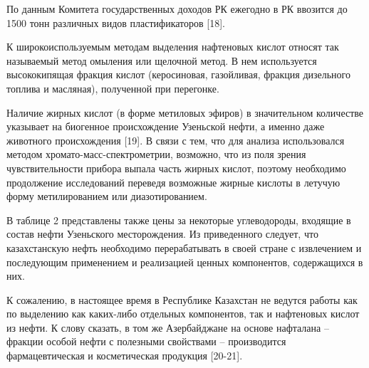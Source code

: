 \begin{multicols}{2}
По данным Комитета государственных доходов РК ежегодно в РК ввозится до
1500 тонн различных видов пластификаторов {[}18{]}.

К широкоиспользуемым методам выделения нафтеновых кислот относят так
называемый метод омыления или щелочной метод. В нем используется
высококипящая фракция кислот (керосиновая, газойливая, фракция
дизельного топлива и масляная), полученной при перегонке.

Наличие жирных кислот (в форме метиловых эфиров) в значительном
количестве указывает на биогенное происхождение Узеньской нефти, а
именно даже животного происхождения {[}19{]}. В связи с тем, что для
анализа использовался методом хромато-масс-спектрометрии, возможно, что
из поля зрения чувствительности прибора выпала часть жирных кислот,
поэтому необходимо продолжение исследований переведя возможные жирные
кислоты в летучую форму метилированием или диазотированием.

В таблице 2 представлены также цены за некоторые углеводороды, входящие
в состав нефти Узеньского месторождения. Из приведенного следует, что
казахстанскую нефть необходимо перерабатывать в своей стране с
извлечением и последующим применением и реализацией ценных компонентов,
содержащихся в них.

К сожалению, в настоящее время в Республике Казахстан не ведутся работы
как по выделению как каких-либо отдельных компонентов, так и нафтеновых
кислот из нефти. К слову сказать, в том же Азербайджане на основе
нафталана -- фракции особой нефти с полезными свойствами -- производится
фармацевтическая и косметическая продукция {[}20-21{]}.
\end{multicols}

